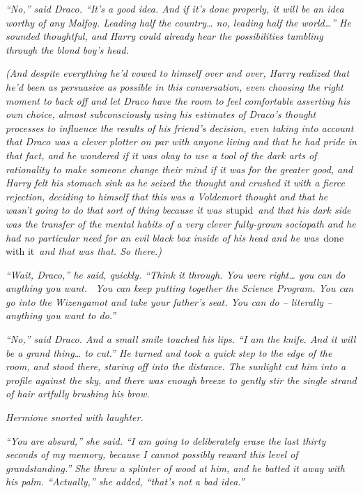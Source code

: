 \emph{``No,'' said Draco. ``It's a good idea. And if it's done properly,
it will be an idea worthy of any Malfoy. Leading half the
country\ldots{} no, leading half the world\ldots{}'' He sounded
thoughtful, and Harry could already hear the possibilities tumbling
through the blond boy's head.}

\emph{(And despite everything he'd vowed to himself over and over, Harry
realized that he'd been as persuasive as possible in this conversation,
even choosing the right moment to back off and let Draco have the room
to feel comfortable asserting his own choice, almost subconsciously
using his estimates of Draco's thought processes to influence the
results of his friend's decision, even taking into account that Draco
was a clever plotter on par with anyone living and that he had pride in
that fact, and he wondered if it was okay to use a tool of the dark arts
of rationality to make someone change their mind if it was for the
greater good, and Harry felt his stomach sink as he seized the thought
and crushed it with a fierce rejection, deciding to himself that this
was a Voldemort thought and that he wasn't going to do that sort of
thing because it was}~stupid~\emph{and that his dark side was the
transfer of the mental habits of a very clever fully-grown sociopath and
he had no particular need for an evil black box inside of his head and
he was}~done with it~\emph{and that was that. So there.)}

\emph{``Wait, Draco,'' he said, quickly. ``Think it through. You were
right\ldots{} you can do anything you want. ~You can keep putting
together the Science Program. You can go into the Wizengamot and take
your father's seat. You can do -- literally -- anything you want to
do.''}

\emph{``No,'' said Draco. And a small smile touched his lips. ``I am the
knife. And it will be a grand thing\ldots{} to cut.'' He turned and took
a quick step to the edge of the room, and stood there, staring off into
the distance. The sunlight cut him into a profile against the sky, and
there was enough breeze to gently stir the single strand of hair
artfully brushing his brow.}

\emph{Hermione snorted with laughter.}

\emph{``You are absurd,'' she said. ``I am going to deliberately erase
the last thirty seconds of my memory, because I cannot possibly reward
this level of grandstanding.'' She threw a splinter of wood at him, and
he batted it away with his palm. ``Actually,'' she added, ``that's not a
bad idea.''}

